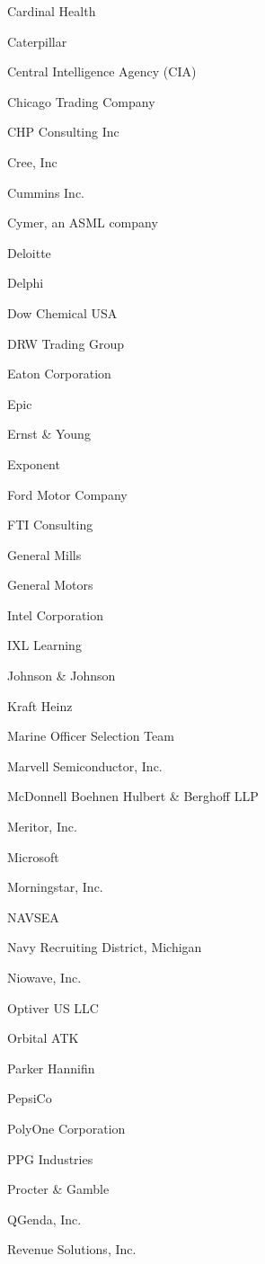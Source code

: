 \documentclass[twoside]{article}
\begin{document}
\begin{center}
\begin{multicols}{5}
\begin{FlushLeft}
\begin{compactitem}
\item Cardinal Health
\item Caterpillar
\item Central Intelligence Agency (CIA)
\item Chicago Trading Company
\item CHP Consulting Inc
\item Cree, Inc
\item Cummins Inc.
\item Cymer, an ASML company
\item Deloitte
\item Delphi
\item Dow Chemical USA
\item DRW Trading Group
\item Eaton Corporation
\item Epic
\item Ernst \& Young
\item Exponent
\item Ford Motor Company
\item FTI Consulting
\item General Mills
\item General Motors
\item Intel Corporation
\item IXL Learning
\item Johnson \& Johnson
\item Kraft Heinz
\item Marine Officer Selection Team
\item Marvell Semiconductor, Inc.
\item McDonnell Boehnen Hulbert \& Berghoff LLP
\item Meritor, Inc.
\item Microsoft
\item Morningstar, Inc.
\item NAVSEA
\item Navy Recruiting District, Michigan
\item Niowave, Inc.
\item Optiver US LLC
\item Orbital ATK
\item Parker Hannifin
\item PepsiCo
\item PolyOne Corporation
\item PPG Industries
\item Procter \& Gamble
\item QGenda, Inc.
\item Revenue Solutions, Inc.

\end{compactitem}
\end{FlushLeft}
\end{multicols}
\end{center}
\end{document}
